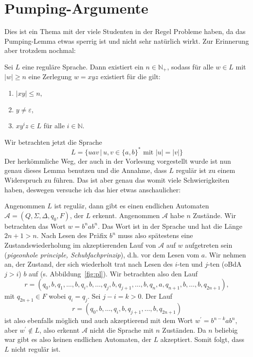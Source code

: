 \documentclass[11pt, a4paper]{article}
\theoremstyle{definition}
\theoremstyle{plain}
\begin{document}
\section*{Pumping-Argumente}
Dies ist ein Thema mit der viele Studenten in der Regel Probleme haben, da das Pumping-Lemma etwas sperrig ist und nicht sehr natürlich wirkt. Zur Erinnerung aber trotzdem nochmal:\par
Sei \( L \) eine reguläre Sprache. Dann existiert ein \( n \in \mathbb{N}_+ \), sodass für alle \( w \in L \) mit \( \left| w \right| \geq n \) eine Zerlegung \( w = xyz \) existiert für die gilt:
\begin{enumerate}
	\item \( \left| xy \right| \leq n \),
	\item \( y \neq \varepsilon \),
	\item \( xy^i z \in L \) für alle \( i \in \mathbb{N} \).
\end{enumerate}
Wir betrachten jetzt die Sprache 
\[
	L = \{ uav \,\vert\, u, v \in \{ a, b \}^\ast \text{ mit } \left| u \right| = \left| v \right| \} 
\]
Der herkömmliche Weg, der auch in der Vorlesung vorgestellt wurde ist nun genau dieses Lemma benutzen und die Annahme, dass \( L \) regulär ist zu einem Widerspruch zu führen. Das ist aber genau das womit viele Schwierigkeiten haben, deswegen versuche ich das hier etwas anschaulicher:\par
Angenommen \( L \) ist regulär, dann gibt es einen endlichen Automaten \( \mathcal{A} = (Q, \Sigma, \Delta, q_0, F) \), der \( L \) erkennt. Angenommen \( \mathcal{A} \) habe \( n \) Zustände. Wir betrachten das Wort \( w = b^n a b^n \). Das Wort ist in der Sprache und hat die Länge \( 2n+1 > n \). Nach Lesen des Präfix \( b^n \) muss also spätestens eine Zustandswiederholung im akzeptierenden Lauf von \( \mathcal{A} \) auf \( w \) aufgetreten sein (\textit{pigeonhole principle, Schubfachprinzip}), d.h. vor dem Lesen vom \( a \). Wir nehmen an, der Zustand, der sich wiederholt trat nach Lesen des \(i\)-ten und \(j\)-ten (oBdA \( j > i \)) \( b \) auf (s. Abbildung~\ref{fig:pl}). Wir betrachten also den Lauf
\[
	r = (q_0, b,  q_1, \ldots, b, q_i, b, \ldots, q_j, b, q_{j+1}, \ldots, b, q_n, a, q_{n+1}, b, \ldots, b, q_{2n+1}),
\]
mit \( q_{2n+1} \in F \) wobei \( q_i = q_j \). Sei \( j-i = k > 0 \). Der Lauf 
\[
	r = (q_0, b, \ldots, q_i, b, q_{j+1}, \ldots, b, q_{2n+1})
\]
ist also ebenfalls möglich und auch akzeptierend mit dem Wort \( w^\prime = b^{n-k}ab^n \), aber \( w^\prime \notin L \), also erkennt \( \mathcal{A} \) nicht die Sprache mit \( n \) Zuständen. Da \( n \) beliebig war gibt es also keinen endlichen Automaten, der \( L \) akzeptiert. Somit folgt, dass \( L \) nicht regulär ist.\par
\end{document}
